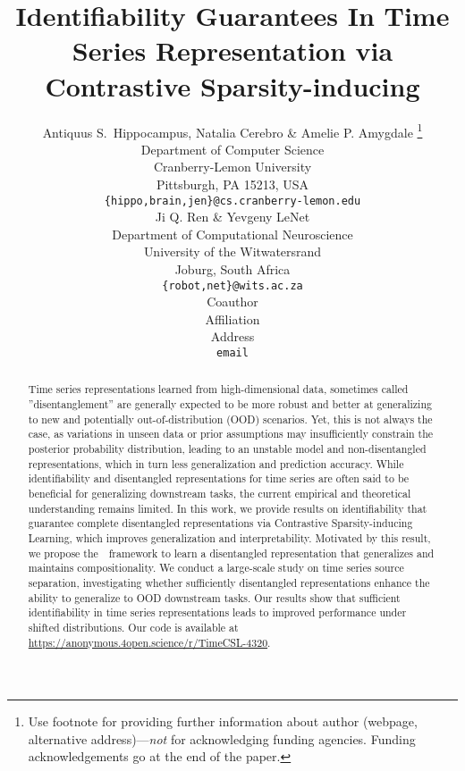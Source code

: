 \documentclass{article} %
\title{Identifiability Guarantees In Time Series Representation via Contrastive Sparsity-inducing}
\author{Antiquus S.~Hippocampus, Natalia Cerebro \& Amelie P. Amygdale \thanks{ Use footnote for providing further information
about author (webpage, alternative address)---\emph{not} for acknowledging
funding agencies.  Funding acknowledgements go at the end of the paper.} \\
Department of Computer Science\\
Cranberry-Lemon University\\
Pittsburgh, PA 15213, USA \\
\texttt{\{hippo,brain,jen\}@cs.cranberry-lemon.edu} \\
\And
Ji Q. Ren \& Yevgeny LeNet \\
Department of Computational Neuroscience \\
University of the Witwatersrand \\
Joburg, South Africa \\
\texttt{\{robot,net\}@wits.ac.za} \\
\AND
Coauthor \\
Affiliation \\
Address \\
\texttt{email}
}
\theoremstyle{plain}
\theoremstyle{definition}
\theoremstyle{remark}
\numberwithin{equation}{section}
\begin{document}
\doparttoc %
\faketableofcontents

\maketitle


\begin{abstract}
Time series representations learned from high-dimensional data, sometimes called ”disentanglement” are generally expected to be more robust and better at generalizing to new and potentially out-of-distribution (OOD) scenarios. Yet, this is not always the case, as variations in unseen data or prior assumptions may insufficiently constrain the posterior probability distribution, leading to an unstable model and non-disentangled representations, which in turn less generalization and prediction accuracy. While identifiability and disentangled representations for time series are often said to be beneficial for generalizing downstream tasks, the current empirical and theoretical understanding remains limited. In this work, we provide results on identifiability that guarantee complete disentangled representations via Contrastive Sparsity-inducing Learning, which improves generalization and interpretability. Motivated by this result, we propose the~\TimeCSL~framework to learn a disentangled representation that generalizes and maintains compositionality. We conduct a large-scale study on time series source separation, investigating whether sufficiently disentangled representations enhance the ability to generalize to OOD downstream tasks. Our results show that sufficient identifiability in time series representations leads to improved performance under shifted distributions. Our code is available at \url{https://anonymous.4open.science/r/TimeCSL-4320}.



\end{abstract}
\end{document}
